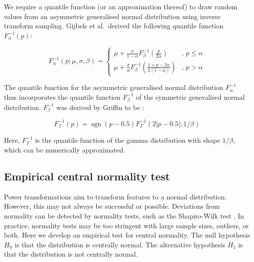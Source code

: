 \documentclass[preprint,12pt,authoryear]{elsarticle}
\DeclareMathOperator{\sgn}{sgn}
\begin{document}
We require a quantile function (or an approximation thereof) to draw
random values from an asymmetric generalised normal distribution using
inverse transform sampling. Gijbels et al.~derived the following
quantile function \(F_{\alpha}^{-1}(p)\):

\begin{equation}
F_{\alpha}^{-1}(p; \mu, \sigma, \beta) =
\begin{cases}
\mu + \frac{\sigma}{1 - \alpha} F_{\beta}^{-1} \left( \frac{p}{2 \alpha}\right) & \text{, } p \leq \alpha \\
\mu + \frac{\sigma}{\alpha} F_{\beta}^{-1} \left( \frac{1 + p - 2 \alpha}{2 \left(1 - \alpha \right)} \right) & \text{, } p > \alpha
\end{cases}
\end{equation}

The quantile function for the asymmetric generalised normal distribution
\(F_{\alpha}^{-1}\) thus incorporates the quantile function
\(F_{\beta}^{-1}\) of the symmetric generalised normal distribution.
\(F_{\beta}^{-1}\) was derived by Griffin to be \citep{Griffin2018-bf}:

\begin{equation}
F_{\beta}^{-1}(p) = \sgn\left(p - 0.5 \right) F_{\Gamma}^{-1}\left(2 \left|p - 0.5 \right|; 1 / \beta \right)
\end{equation}

Here, \(F_{\Gamma}^{-1}\) is the quantile function of the gamma
distribution with shape \(1 / \beta\), which can be numerically
approximated.

\subsection{Empirical central normality
test}\label{empirical-central-normality-test}

Power transformations aim to transform features to a normal
distribution. However, this may not always be successful or possible.
Deviations from normality can be detected by normality tests, such as
the Shapiro-Wilk test \citep{Shapiro1965-zd}. In practice, normality
tests may be too stringent with large sample sizes, outliers, or both.
Here we develop an empirical test for central normality. The null
hypothesis \(H_0\) is that the distribution is centrally normal. The
alternative hypothesis \(H_1\) is that the distribution is not centrally
normal.
\end{document}
